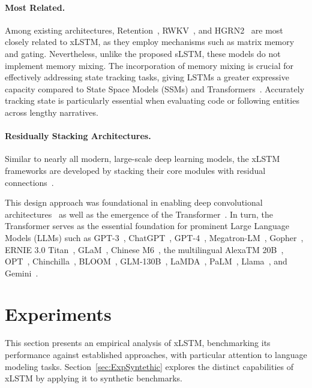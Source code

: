 \paragraph{Most Related.} Among existing architectures, Retention~\citep{Sun:23arxiv}, RWKV~\citep{Peng:23arxivshort,Peng:24arxivshort}, and HGRN2~\citep{Qin:24arxiv} are most closely related to xLSTM, as they employ mechanisms such as matrix memory and gating. Nevertheless, unlike the proposed sLSTM, these models do not implement memory mixing. The incorporation of memory mixing is crucial for effectively addressing state tracking tasks, giving LSTMs a greater expressive capacity compared to State Space Models (SSMs) and Transformers~\citep{Merrill:24,Deletang:23}. Accurately tracking state is particularly essential when evaluating code or following entities across lengthy narratives.

\paragraph{Residually Stacking Architectures.} Similar to nearly all modern, large-scale deep learning models, the xLSTM frameworks are developed by stacking their core modules with residual connections~\citep{Srivastava:15,He:16}.

This design approach was foundational in enabling deep convolutional architectures~\citep{He:16} as well as the emergence of the Transformer~\citep{Vaswani:17}. In turn, the Transformer serves as the essential foundation for prominent Large Language Models (LLMs) such as GPT-3~\citep{Brown:20short}, ChatGPT~\citep{Schulman:22short}, GPT-4~\citep{Achiam:23gpt4short}, Megatron-LM~\citep{Shoeybi:19}, Gopher~\citep{Rae:21short}, ERNIE 3.0 Titan~\citep{Wang:21arxivshort}, GLaM~\citep{Du:21glamshort}, Chinese M6~\citep{Lin:21}, the multilingual AlexaTM 20B~\citep{Soltan:22}, OPT~\citep{Zhang:22opt}, Chinchilla~\citep{Hoffmann:22short}, BLOOM~\citep{Scao:22arxivshort}, GLM-130B~\citep{Zeng:22arxivshort}, LaMDA~\citep{Thoppilan:22short}, PaLM~\citep{Chowdhery:22short}, Llama~\citep{Touvron:23arxiv}, and Gemini~\citep{GeminiTeam:23arxiv,Reid:24arxiv}.

\section{Experiments}
\label{sec:Exp}

This section presents an empirical analysis of xLSTM, benchmarking its performance against established approaches, with particular attention to language modeling tasks. Section~\ref{sec:ExpSyntethic} explores the distinct capabilities of xLSTM by applying it to synthetic benchmarks. 

